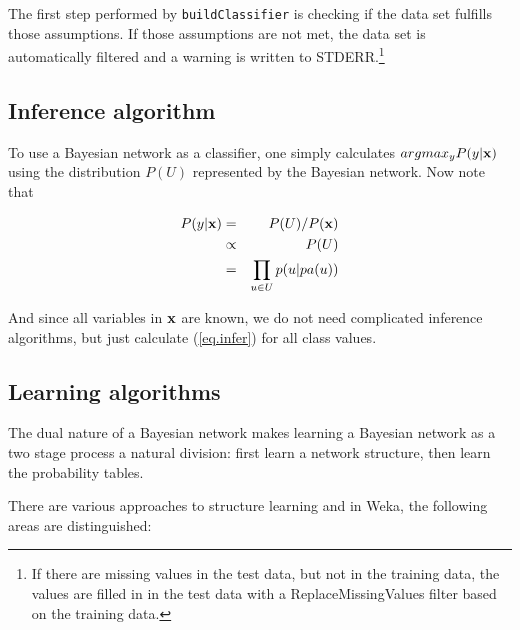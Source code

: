 \documentclass[a4paper]{article}
\begin{document}
The first step performed by {\tt buildClassifier} is checking if the data set fulfills
those assumptions. If those assumptions are not met, the data set is automatically
filtered and a warning is written to STDERR.\footnote{If there are missing values
in the test data, but not in the training data, the values are filled in in the
test data with a ReplaceMissingValues filter based on the training data.}

\subsection*{Inference algorithm}

To use a Bayesian network as a classifier, one simply calculates $argmax_yP(y|{\bf x})$
using the distribution $P(U)$ represented by the Bayesian network. 
Now note that

\begin{eqnarray}
P(y|{\bf x})&=&P(U)/P({\bf x})\nonumber\\
&\propto& P(U)\nonumber\\
&=&\prod_{u\in U}p(u|pa(u))\label{eq.infer}%
\end{eqnarray}

And since all variables in ${\bf x}$ are known, we do not need complicated inference
algorithms, but just calculate (\ref{eq.infer}) for all class values.

\subsection*{Learning algorithms}

The dual nature of a Bayesian network makes learning a Bayesian
network as a two stage process a natural division: first learn a
network structure, then learn the probability tables.

There are various approaches to structure learning and in Weka, the
following areas are distinguished:
\end{document}

